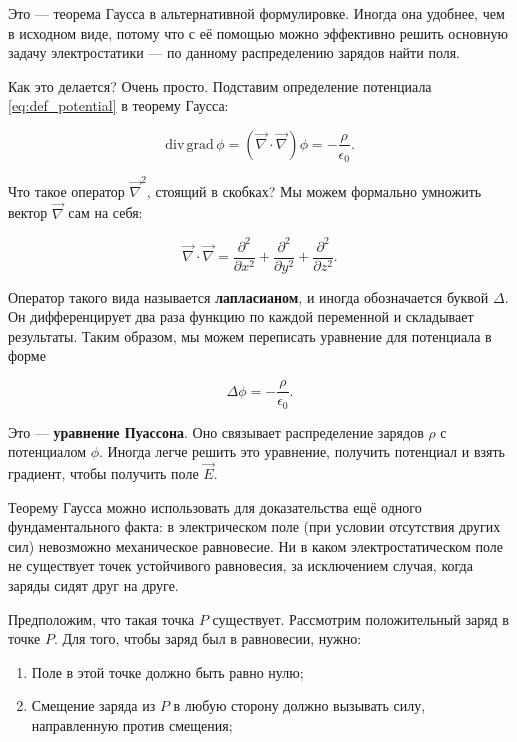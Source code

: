 \documentclass[11pt,a4paper]{article}
\numberwithin{equation}{section}
\newcommand{\pt}{\partial}
\newcommand{\grad}{\mathrm{grad}\,}
\renewcommand{\div}{\mathrm{div}\,}
\newcommand{\vn}{\vec{\nabla}}
\newcommand{\eps}{\epsilon}
\begin{document}
Это --- теорема Гаусса в альтернативной формулировке. Иногда она
удобнее, чем в исходном виде, потому что с её помощью можно эффективно
решить основную задачу электростатики --- по данному распределению
зарядов найти поля. 

Как это делается? Очень просто. Подставим определение потенциала
\eqref{eq:def_potential} в теорему Гаусса:

\begin{equation}
  \label{eq:poisson_1}
  \div \grad \phi =( \vn \cdot \vn) \phi =  -\frac{\rho}{\eps_0}. 
\end{equation}

Что такое оператор $\vn^2$, стоящий в скобках? Мы можем формально
умножить вектор $\vn$ сам на себя: 

\begin{equation}
  \label{eq:poisson_2}
  \vn \cdot \vn = \frac{\pt^2}{\pt x^2} + \frac{\pt^2}{\pt y^2} + \frac{\pt^2}{\pt z^2}.
\end{equation}

Оператор такого вида называется \textbf{лапласианом}, и иногда
обозначается буквой $\Delta$. Он дифференцирует два раза функцию по
каждой переменной и складывает результаты. Таким образом, мы можем
переписать уравнение для потенциала в форме

\begin{equation}
  \label{eq:poisson_3}
  \Delta \phi = -\frac{\rho}{\eps_0}.
\end{equation}

Это --- \textbf{уравнение Пуассона}. Оно связывает распределение
зарядов $\rho$ с потенциалом $\phi$. Иногда легче решить это
уравнение, получить потенциал и взять градиент, чтобы получить поле
$\vec{E}$. 

Теорему Гаусса можно использовать для доказательства ещё одного
фундаментального факта: в электрическом поле (при условии отсутствия
других сил) невозможно механическое равновесие. Ни в каком
электростатическом поле не существует точек устойчивого равновесия, за
исключением случая, когда заряды сидят друг на друге. 

Предположим, что такая точка $P$ существует. Рассмотрим положительный
заряд в точке $P$. Для того, чтобы заряд был в равновесии, нужно:

\begin{enumerate}
\item Поле в этой точке должно быть равно нулю;
\item Смещение заряда из $P$ в любую сторону должно вызывать силу,
  направленную против смещения;
\end{enumerate}
\end{document}
